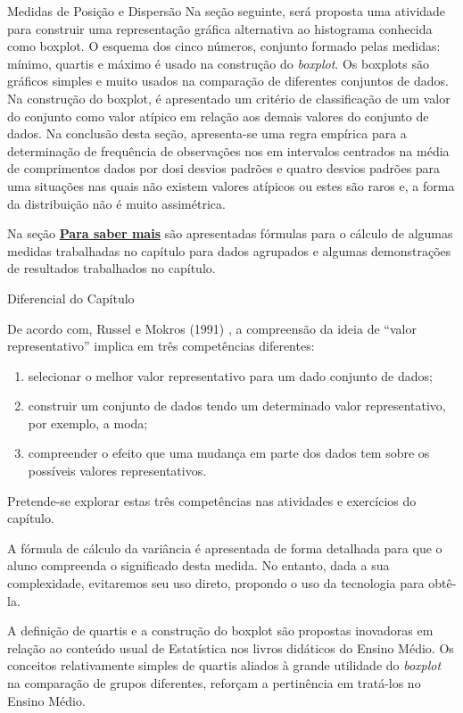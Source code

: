 \begin{apresentacao}{Medidas de Posição e Dispersão}
Na seção seguinte, será proposta uma atividade para construir uma representação gráfica alternativa ao histograma conhecida como boxplot. O esquema dos cinco números, conjunto formado pelas medidas: mínimo, quartis e máximo é usado na construção do \textit{boxplot}. Os boxplots são gráficos simples e muito usados na comparação de diferentes conjuntos de dados. Na construção do boxplot, é apresentado um critério de classificação de um valor do conjunto como valor atípico em relação aos demais valores do conjunto de dados. Na conclusão desta seção, apresenta-se uma regra empírica para a determinação de frequência de observações nos em intervalos centrados na média de comprimentos dados por dosi desvios padrões e quatro desvios padrões para uma situações nas quais não existem valores atípicos ou estes são raros e, a forma da distribuição não é muito assimétrica.

Na seção \hyperref[\detokenize{PE104-A:sec-para-saber-mais}]{\textbf{Para saber mais}} são apresentadas fórmulas para o cálculo de algumas medidas trabalhadas no capítulo para dados agrupados e algumas demonstrações de resultados trabalhados no capítulo.

Diferencial do Capítulo

De acordo com, Russel e Mokros (1991) \citep[apud][]{batanero2016}, a compreensão da ideia de “valor representativo”{} implica em três competências diferentes:

\begin{enumerate}
\item selecionar o melhor valor representativo para um dado conjunto de dados;
\item construir um conjunto de dados tendo um determinado valor representativo, por exemplo, a moda;
\item compreender o efeito que uma mudança em parte dos dados tem sobre os possíveis valores representativos.
\end{enumerate}
Pretende-se explorar estas três competências nas atividades e exercícios do capítulo.

A fórmula de cálculo da variância é apresentada de forma detalhada para que o aluno compreenda o significado desta medida. No entanto, dada a sua complexidade, evitaremos seu uso direto, propondo o uso da tecnologia para obtê-la.

A definição de quartis e a construção do boxplot são propostas inovadoras em relação ao conteúdo usual de Estatística nos livros didáticos do Ensino Médio. Os conceitos relativamente simples de quartis aliados à grande utilidade do \textit{boxplot} na comparação de grupos diferentes, reforçam a pertinência em tratá-los no Ensino Médio.


\end{apresentacao}
